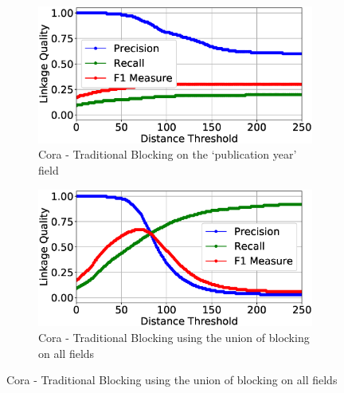 \documentclass{llncs}
\begin{document}
\begin{figure}
\begin{subfigure}{.5\textwidth}
  \centering
\includegraphics[width=\textwidth]{figures/plotLQ-cora-trad-year}
\caption{Cora - Traditional Blocking on the `publication year' field}
\end{subfigure}%
\begin{subfigure}{.5\textwidth}
  \centering
\includegraphics[width=\textwidth]{figures/plotLQ-cora-trad-combined}
\caption{Cora - Traditional Blocking using the union of blocking on all fields}
\end{subfigure}


\end{figure}
\end{document}
